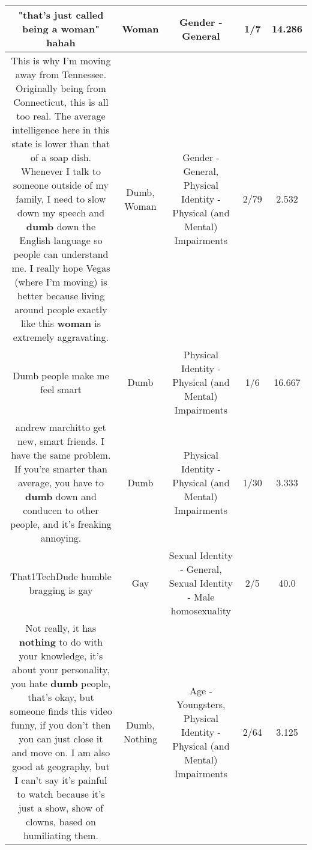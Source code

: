 \documentclass[11pt]{article}
\newlength\mylength
\begin{document}
\begin{center}
\begin{longtable}{|C{.65\mylength}|C{.30\mylength}|C{.12\mylength}|C{.12\mylength}|C{.12\mylength}|}
  \small "that's just called being a \textbf{woman}" hahah\normalsize   & Woman & Gender - General & 1/7 & 14.286 \\  \hline
  \small This is why I'm moving away from Tennessee. Originally being from Connecticut, this is all too real. The average intelligence here in this state is lower than that of a soap dish. Whenever I talk to someone outside of my family, I need to slow down my speech and \textbf{dumb} down the English language so people can understand me. I really hope Vegas (where I'm moving) is better because living around people exactly like this \textbf{woman} is extremely aggravating.\normalsize   & Dumb, Woman & Gender - General, Physical Identity - Physical (and Mental) Impairments & 2/79 & 2.532 \\  \hline
  \small Dumb people make me feel smart\normalsize   & Dumb & Physical Identity - Physical (and Mental) Impairments & 1/6 & 16.667 \\  \hline
  \small andrew marchitto get new, smart friends. I have the same problem. If you're smarter than average, you have to \textbf{dumb} down and conducen to other people, and it's freaking annoying.\normalsize   & Dumb & Physical Identity - Physical (and Mental) Impairments & 1/30 & 3.333 \\  \hline
  \small That1TechDude humble bragging is gay\normalsize   & Gay & Sexual Identity - General, Sexual Identity - Male homosexuality & 2/5 & 40.0 \\  \hline
  \small Not really, it has \textbf{nothing} to do with your knowledge, it's about your personality, you hate \textbf{dumb} people, that's okay, but someone finds this video funny, if you don't then you can just close it and move on. I am also good at geography, but I can't say it's painful to watch because it's just a show, show of clowns, based on humiliating them.\normalsize   & Dumb, Nothing & Age - Youngsters, Physical Identity - Physical (and Mental) Impairments & 2/64 & 3.125 \\  \hline

\end{longtable}
\end{center}
\end{document}
